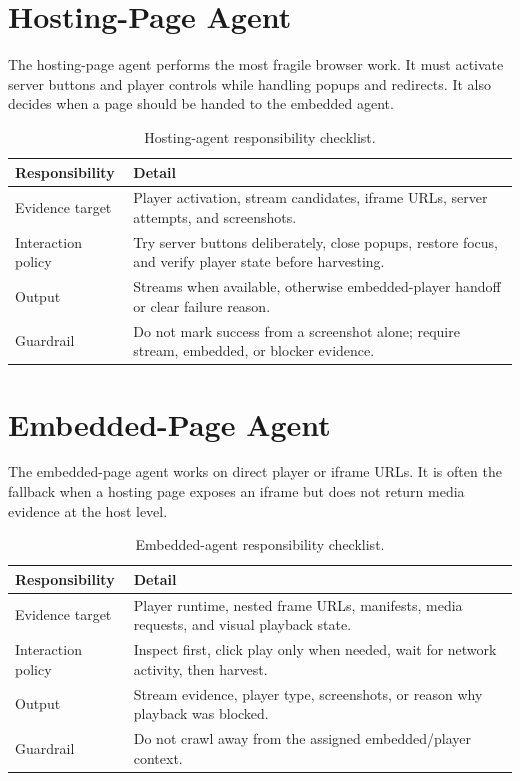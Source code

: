 \section{Hosting-Page Agent}

The hosting-page agent performs the most fragile browser work. It must activate
server buttons and player controls while handling popups and redirects. It also
decides when a page should be handed to the embedded agent.



\begin{table}[!htbp]
\centering
\begin{tabularx}{\textwidth}{Q{3.5cm}Y}
\toprule
{}
Responsibility & Detail \\
\midrule
Evidence target & Player activation, stream candidates, iframe URLs, server
attempts, and screenshots. \\
Interaction policy & Try server buttons deliberately, close popups, restore
focus, and verify player state before harvesting. \\
Output & Streams when available, otherwise embedded-player handoff or clear
failure reason. \\
Guardrail & Do not mark success from a screenshot alone; require stream,
embedded, or blocker evidence. \\
\bottomrule
\end{tabularx}
\caption{Hosting-agent responsibility checklist.}
\label{tab:appendix-hosting-checklist}
\end{table}

\section{Embedded-Page Agent}

The embedded-page agent works on direct player or iframe URLs. It is often the
fallback when a hosting page exposes an iframe but does not return media
evidence at the host level.



\begin{table}[!htbp]
\centering
\begin{tabularx}{\textwidth}{Q{3.5cm}Y}
\toprule
{}
Responsibility & Detail \\
\midrule
Evidence target & Player runtime, nested frame URLs, manifests, media requests,
and visual playback state. \\
Interaction policy & Inspect first, click play only when needed, wait for
network activity, then harvest. \\
Output & Stream evidence, player type, screenshots, or reason why playback was
blocked. \\
Guardrail & Do not crawl away from the assigned embedded/player context. \\
\bottomrule
\end{tabularx}
\caption{Embedded-agent responsibility checklist.}
\label{tab:appendix-embedded-checklist}
\end{table}

